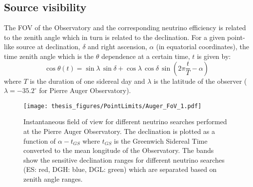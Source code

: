 \subsection{Source visibility}
\label{subsec:psource_coverage}
The \gls{FOV} of the Observatory and the corresponding neutrino efficiency is related to the zenith angle which in turn is related to the declination. For a given point-like source at declination, $\delta$ and right ascension, $\alpha$ (in equatorial coordinates), the time zenith angle which is the $\theta$ dependence at a certain time, $t$ is given by:
\begin{equation}
  \label{eq:zenith_angle_time}
  \cos \theta(t) = \sin \lambda \,\sin \delta+ \cos \lambda \, \cos \delta \,\sin (2\pi \frac{t}{T} - \alpha)
\end{equation} 
where $T$ is the duration of one sidereal day and $\lambda$ is the latitude of the observer ($\lambda = -35.2^{\circ}$ for Pierre Auger Observatory). 

\begin{figure}[t!]
  \centering
  \texttt{[image: thesis\_figures/PointLimits/Auger\_FoV\_1.pdf]}
  \caption{Instantaneous field of view for different neutrino searches performed at the Pierre Auger Observatory. The declination is plotted as a function of $\alpha - t_{GS}$ where $t_{GS}$ is the Greenwich Sidereal Time converted to the mean longitude of the Observatory. The bands show the sensitive declination ranges for different neutrino searches (ES: red, DGH: blue, DGL: green) which are separated based on zenith angle ranges.}
  \label{fig:Auger_FoV}
\end{figure}

